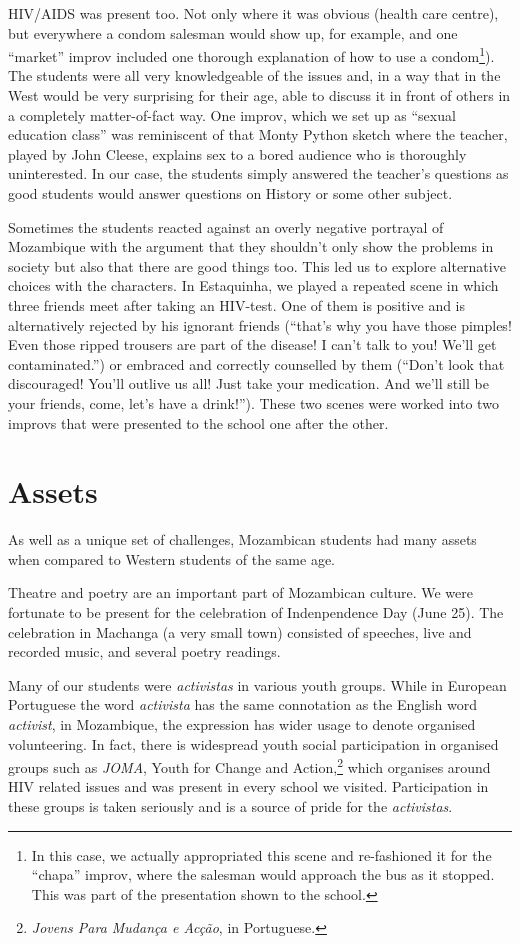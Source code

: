 \documentclass[article,twocolumn,twoside]{memoir}
\begin{document}
HIV/AIDS was present too. Not only where it was obvious (health care centre),
but everywhere a condom salesman would show up, for example, and one ``market''
improv included one thorough explanation of how to use a condom\footnote{In
this case, we actually appropriated this scene and re-fashioned it for the
``chapa'' improv, where the salesman would approach the bus as it stopped. This
was part of the presentation shown to the school.}). The students were all
very knowledgeable of the issues and, in a way that in the West would be very
surprising for their age, able to discuss it in front of others in a completely
matter-of-fact way. One improv, which we set up as ``sexual education class''
was reminiscent of that Monty Python sketch where the teacher, played by John
Cleese, explains sex to a bored audience who is thoroughly uninterested. In our
case, the students simply answered the teacher's questions as good students
would answer questions on History or some other subject.

Sometimes the students reacted against an overly negative portrayal of
Mozambique with the argument that they shouldn't only show the problems in
society but also that there are good things too. This led us to explore
alternative choices with the characters. In Estaquinha, we played a repeated
scene in which three friends meet after taking an HIV-test. One of them is
positive and is alternatively rejected by his ignorant friends (``that's why
you have those pimples! Even those ripped trousers are part of the disease! I
can't talk to you! We'll get contaminated.'') or embraced and correctly
counselled by them (``Don't look that discouraged! You'll outlive us all! Just
take your medication. And we'll still be your friends, come, let's have a
drink!''). These two scenes were worked into two improvs that were presented to
the school one after the other.

\chapter{Assets}
As well as a unique set of challenges, Mozambican students had many assets when
compared to Western students of the same age.

Theatre and poetry are an important part of Mozambican culture. We were
fortunate to be present for the celebration of Indenpendence Day (June 25). The
celebration in Machanga (a very small town) consisted of speeches, live and
recorded music, and several poetry readings.

Many of our students were \textit{activistas} in various youth groups. While in
European Portuguese the word \textit{activista} has the same connotation as the
English word \textit{activist}, in Mozambique, the expression has wider usage
to denote organised volunteering. In fact, there is widespread youth social
participation in organised groups such as \textit{JOMA}, Youth for Change and
Action,\footnote{\textit{Jovens Para Mudança e Acção}, in Portuguese.} which
organises around HIV related issues and was present in every school we visited.
Participation in these groups is taken seriously and is a source of pride for
the \textit{activistas}.
\end{document}

